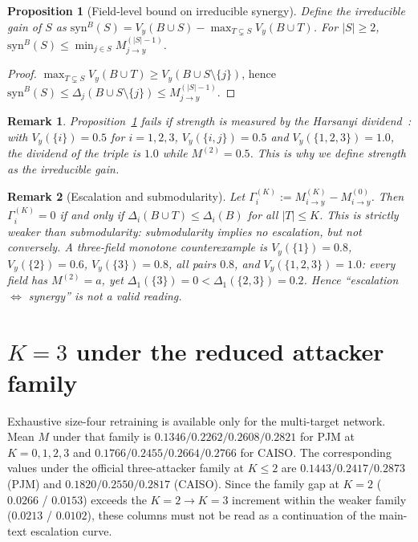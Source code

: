 \documentclass[preprint,12pt]{elsarticle}
\newtheorem{proposition}{Proposition}
\newtheorem{remark}{Remark}
\newcommand{\Vy}{V_{y}}
\newcommand{\Mik}{M^{(K)}_{i \to y}}
\begin{document}
\begin{proposition}[Field-level bound on irreducible synergy]\label{prop:syn}
Define the irreducible gain of $S$ as
$\mathrm{syn}^{B}(S)=\Vy(B\cup S)-\max_{T\subsetneq S}\Vy(B\cup T)$. For $|S|\ge 2$,
$\mathrm{syn}^{B}(S)\le \min_{j\in S} M^{(|S|-1)}_{j\to y}$.
\end{proposition}
\begin{proof}
$\max_{T\subsetneq S}\Vy(B\cup T)\ge \Vy(B\cup S\setminus\{j\})$, hence
$\mathrm{syn}^{B}(S)\le \Delta_j(B\cup S\setminus\{j\})\le M^{(|S|-1)}_{j\to y}$.
\end{proof}

\begin{remark}
Proposition~\ref{prop:syn} fails if strength is measured by the Harsanyi
dividend~\cite{harsanyi1963dividend}: with $\Vy(\{i\})=0.5$ for $i=1,2,3$,
$\Vy(\{i,j\})=0.5$ and $\Vy(\{1,2,3\})=1.0$, the dividend of the triple is $1.0$ while
$M^{(2)}=0.5$. This is why we define strength as the irreducible gain.
\end{remark}

\begin{remark}[Escalation and submodularity]
Let $\Gamma^{(K)}_i := \Mik - M^{(0)}_{i\to y}$. Then $\Gamma^{(K)}_i=0$ if and only if
$\Delta_i(B\cup T)\le\Delta_i(B)$ for all $|T|\le K$. This is strictly weaker than
submodularity: submodularity implies no escalation, but not conversely. A three-field
monotone counterexample is $\Vy(\{1\})=0.8$, $\Vy(\{2\})=0.6$, $\Vy(\{3\})=0.8$, all pairs
$0.8$, and $\Vy(\{1,2,3\})=1.0$: every field has $M^{(2)}=a$, yet
$\Delta_1(\{3\})=0<\Delta_1(\{2,3\})=0.2$. Hence ``escalation $\iff$ synergy'' is not a
valid reading.
\end{remark}

\section{$K=3$ under the reduced attacker family}\label{app:k3}
Exhaustive size-four retraining is available only for the multi-target network. Mean $M$
under that family is $0.1346/0.2262/0.2608/0.2821$ for PJM at $K=0,1,2,3$ and
$0.1766/0.2455/0.2664/0.2766$ for CAISO. The corresponding values under the official
three-attacker family at $K\le 2$ are $0.1443/0.2417/0.2873$ (PJM) and
$0.1820/0.2550/0.2817$ (CAISO). Since the family gap at $K=2$ ($0.0266$ / $0.0153$) exceeds
the $K{=}2\to K{=}3$ increment within the weaker family ($0.0213$ / $0.0102$), these columns
must not be read as a continuation of the main-text escalation curve.



\end{document}
